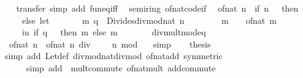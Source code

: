 \begin{isabellebody}
%
\isadelimproof
\ \ %
\endisadelimproof
%
\isatagproof
{}\isamarkupfalse%
\ transfer\ {\isacharparenleft}simp\ add{\isacharcolon}\ fun{\isacharunderscore}eq{\isacharunderscore}iff{\isacharparenright}%
\endisatagproof
{\isafoldproof}%
%
\isadelimproof
\isanewline
%
\endisadelimproof
\isanewline
{}\isamarkupfalse%
\isanewline
\isanewline
{}\isamarkupfalse%
\ {\isacharparenleft}\ semiring{\isacharunderscore}{}{\isacharparenright}\ of{\isacharunderscore}nat{\isacharunderscore}code{\isacharunderscore}if{\isacharcolon}\isanewline
\ \ {\isachardoublequoteopen}of{\isacharunderscore}nat\ n\ {\isacharequal}\ {\isacharparenleft}if\ n\ {\isacharequal}\ {}\ then\ {}\isanewline
\ \ \ \ \ else\ let\isanewline
\ \ \ \ \ \ \ {\isacharparenleft}m{\isacharcomma}\ q{\isacharparenright}\ {\isacharequal}\ Divides{\isachardot}divmod{\isacharunderscore}nat\ n\ {}{\isacharsemicolon}\isanewline
\ \ \ \ \ \ \ m{\isacharprime}\ {\isacharequal}\ {}\ {\isacharasterisk}\ of{\isacharunderscore}nat\ m\isanewline
\ \ \ \ \ in\ if\ q\ {\isacharequal}\ {}\ then\ m{\isacharprime}\ else\ m{\isacharprime}\ {\isacharplus}\ {}{\isacharparenright}{\isachardoublequoteclose}\isanewline
%
\isadelimproof
%
\endisadelimproof
%
\isatagproof
{}\isamarkupfalse%
\ {\isacharminus}\isanewline
\ \ \isamarkupfalse%
\ div{\isacharunderscore}mult{\isacharunderscore}mod{\isacharunderscore}eq\ \isamarkupfalse%
\ {\isacharasterisk}{\isacharcolon}\ {\isachardoublequoteopen}of{\isacharunderscore}nat\ n\ {\isacharequal}\ of{\isacharunderscore}nat\ {\isacharparenleft}n\ div\ {}\ {\isacharasterisk}\ {}\ {\isacharplus}\ n\ mod\ {}{\isacharparenright}{\isachardoublequoteclose}\ \isamarkupfalse%
\ simp\isanewline
\ \ \isamarkupfalse%
\ {\isacharquery}thesis\isanewline
\ \ \ \ \isamarkupfalse%
\ {\isacharparenleft}simp\ add{\isacharcolon}\ Let{\isacharunderscore}def\ divmod{\isacharunderscore}nat{\isacharunderscore}div{\isacharunderscore}mod\ of{\isacharunderscore}nat{\isacharunderscore}add\ {\isacharbrackleft}symmetric{\isacharbrackright}{\isacharparenright}\isanewline
\ \ \ \ \ \ {\isacharparenleft}simp\ add{\isacharcolon}\ {\isacharasterisk}\ mult{\isachardot}commute\ of{\isacharunderscore}nat{\isacharunderscore}mult\ add{\isachardot}commute{\isacharparenright}\isanewline
{}\isamarkupfalse%
%
\endisatagproof
{\isafoldproof}%
%
\isadelimproof

\end{isabellebody}
